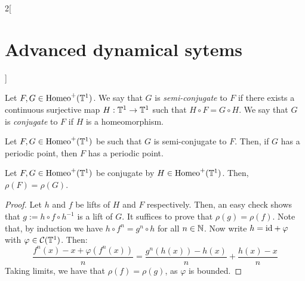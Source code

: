 \documentclass[../../../main_math.tex]{subfiles}
\begin{document}
\begin{multicols}{2}[\section{Advanced dynamical sytems}]
\begin{definition}
  \end{definition}
  \begin{definition}
    Let $F,G\in\mathrm{Homeo}^+(\mathbb{T}^1)$. We say that $G$ is \emph{semi-conjugate} to $F$ if there exists a continuous surjective map $H:\mathbb{T}^1\to \mathbb{T}^1$ such that $H\circ F=G\circ H$. We say that $G$ is \emph{conjugate} to $F$ if $H$ is a homeomorphism.
  \end{definition}
  \begin{lemma}
    Let $F,G\in\mathrm{Homeo}^+(\mathbb{T}^1)$ be such that $G$ is semi-conjugate to $F$. Then, if $G$ has a periodic point, then $F$ has a periodic point.
  \end{lemma}
  \begin{theorem}
    Let $F,G\in\mathrm{Homeo}^+(\mathbb{T}^1)$ be conjugate by $H\in \mathrm{Homeo}^+(\mathbb{T}^1)$. Then, $\rho(F)=\rho(G)$.
  \end{theorem}
  \begin{proof}
    Let $h$ and $f$ be lifts of $H$ and $F$ respectively. Then, an easy check shows that $g:=h\circ f\circ h^{-1}$ is a lift of $G$. It suffices to prove that $\rho(g)=\rho(f)$. Note that, by induction we have $h\circ f^n=g^n\circ h$ for all $n\in\mathbb{N}$. Now write $h=\mathrm{id} + \varphi$ with $\varphi\in \mathcal{C}(\mathbb{T}^1)$. Then:
    \begin{equation*}
      \frac{f^n(x)-x+\varphi(f^n(x))}{n}= \frac{g^n(h(x))-h(x)}{n}+\frac{h(x)-x}{n}
    \end{equation*}
    Taking limits, we have that $\rho(f)=\rho(g)$, as $\varphi$ is bounded.
  \end{proof}

\end{multicols}
\end{document}
